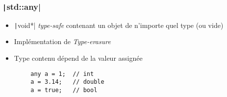\documentclass[C++.tex]{subfiles}
\begin{document}
\begin{frame}[fragile]
\end{frame}

\begin{frame}[fragile]
	\frametitle{\texttt|std::any|}
	\begin{itemize}
		\item \texttt|void*| \textit{type-safe} contenant un objet de n'importe quel type (ou vide)
		\item Implémentation de \textit{Type-erasure}
		\item Type contenu dépend de la valeur assignée
	\end{itemize}

	\begin{verbatim}
		any a = 1;  // int
		a = 3.14;   // double
		a = true;   // bool
	\end{verbatim}

\end{frame}
\end{document}
